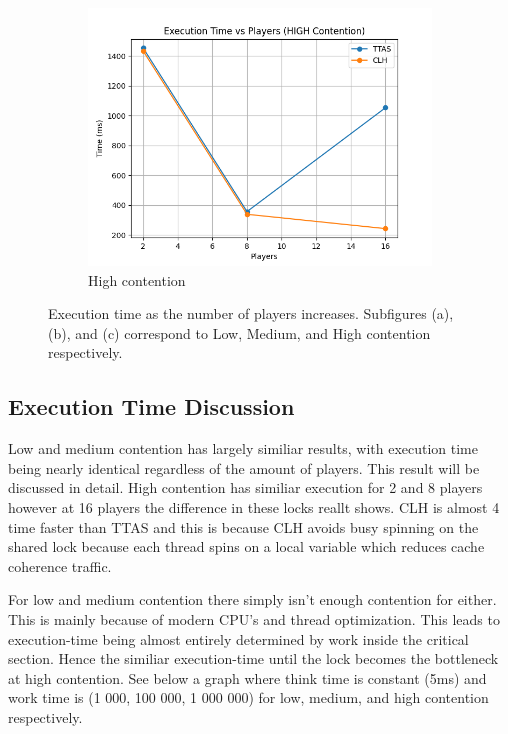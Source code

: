 \documentclass[12pt,a4paper]{article}
\begin{document}
\begin{figure}[H]
  \vspace{0.5em}
  \begin{subfigure}{0.65\textwidth}
    \centering
    \includegraphics[width=\linewidth]{plot_time_HIGH.png}
    \caption{High contention}
    \label{fig:time-high}
  \end{subfigure}
  
  \caption{Execution time as the number of players increases. Subfigures (a), (b), and (c) correspond to Low, Medium, and High contention respectively.}
  \label{fig:execution-time}
\end{figure}
  
\clearpage
\subsection{Execution Time Discussion}
Low and medium contention has largely similiar results, with execution time being nearly identical regardless of the amount of players. This result will be discussed in detail.
High contention has similiar execution for 2 and 8 players however at 16 players the difference in these locks reallt shows. CLH is almost 4 time faster than TTAS and this is because CLH avoids busy spinning on the shared lock because each thread spins on a local variable which reduces cache coherence traffic.

For low and medium contention there simply isn't enough contention for
 either. This is mainly because of modern CPU's and thread optimization. This leads to execution-time being almost entirely determined by work inside the critical section. Hence the similiar execution-time until the lock becomes the bottleneck at high contention. See below a graph where think time is constant (5ms) and work time is (1 000, 100 000, 1 000 000) for low, medium, and high contention respectively.
\end{document}
